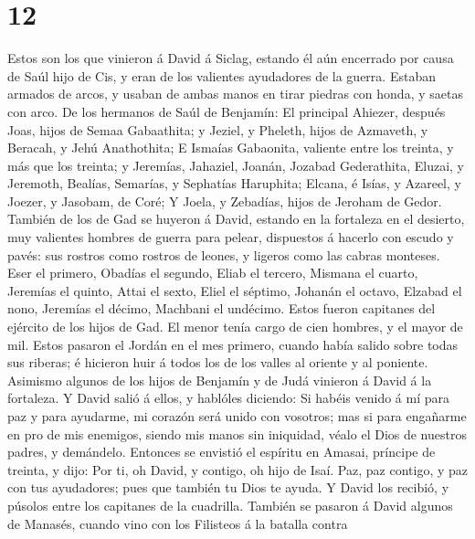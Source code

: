 \hypertarget{section-11}{%
\section{12}\label{section-11}}

 Estos son los que vinieron á David á Siclag, estando él aún
encerrado por causa de Saúl hijo de Cis, y eran de los valientes
ayudadores de la guerra.  Estaban armados de arcos, y usaban
de ambas manos en tirar piedras con honda, y saetas con arco. De los
hermanos de Saúl de Benjamín:  El principal Ahiezer, después
Joas, hijos de Semaa Gabaathita; y Jeziel, y Pheleth, hijos de Azmaveth,
y Beracah, y Jehú Anathothita;  E Ismaías Gabaonita,
valiente entre los treinta, y más que los treinta; y Jeremías, Jahaziel,
Joanán, Jozabad Gederathita,  Eluzai, y Jeremoth, Bealías,
Semarías, y Sephatías Haruphita;  Elcana, é Isías, y
Azareel, y Joezer, y Jasobam, de Coré;  Y Joela, y Zebadías,
hijos de Jeroham de Gedor.  También de los de Gad se huyeron
á David, estando en la fortaleza en el desierto, muy valientes hombres
de guerra para pelear, dispuestos á hacerlo con escudo y pavés: sus
rostros como rostros de leones, y ligeros como las cabras monteses.
 Eser el primero, Obadías el segundo, Eliab el tercero,
 Mismana el cuarto, Jeremías el quinto,  Attai
el sexto, Eliel el séptimo,  Johanán el octavo, Elzabad el
nono,  Jeremías el décimo, Machbani el undécimo.
 Estos fueron capitanes del ejército de los hijos de Gad.
El menor tenía cargo de cien hombres, y el mayor de mil. 
Estos pasaron el Jordán en el mes primero, cuando había salido sobre
todas sus riberas; é hicieron huir á todos los de los valles al oriente
y al poniente.  Asimismo algunos de los hijos de Benjamín y
de Judá vinieron á David á la fortaleza.  Y David salió á
ellos, y hablóles diciendo: Si habéis venido á mí para paz y para
ayudarme, mi corazón será unido con vosotros; mas si para engañarme en
pro de mis enemigos, siendo mis manos sin iniquidad, véalo el Dios de
nuestros padres, y demándelo.  Entonces se envistió el
espíritu en Amasai, príncipe de treinta, y dijo: Por ti, oh David, y
contigo, oh hijo de Isaí. Paz, paz contigo, y paz con tus ayudadores;
pues que también tu Dios te ayuda. Y David los recibió, y púsolos entre
los capitanes de la cuadrilla.  También se pasaron á David
algunos de Manasés, cuando vino con los Filisteos á la batalla contra
